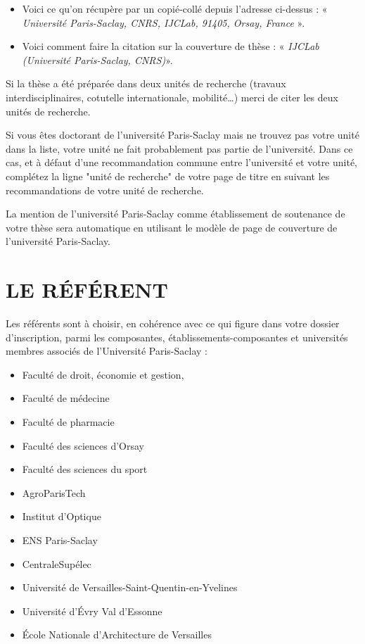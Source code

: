 \documentclass[french,12pt,a4paper]{book}
\begin{document}
\begin{itemize}
\renewcommand{\labelitemi}{$\bullet$}
\item Voici ce qu’on récupère par un copié-collé depuis l’adresse ci-dessus : « \textit{Université Paris-Saclay, CNRS, IJCLab, 91405, Orsay, France} ».
\item Voici comment faire la citation sur la couverture de thèse : « \textit{IJCLab (Université Paris-Saclay, CNRS)}».
\end{itemize}

Si la thèse a été préparée dans deux unités de recherche (travaux interdisciplinaires, cotutelle internationale, mobilité…) merci de citer les deux unités de recherche.\\ \par
Si vous êtes doctorant de l'université Paris-Saclay mais ne trouvez pas votre unité dans la liste, votre unité ne fait probablement pas partie de l'université. Dans ce cas, et à défaut d'une recommandation commune entre l'université et votre unité, complétez la ligne "unité de recherche" de votre page de titre en suivant les recommandations de votre unité de recherche.\\ \par
La mention de l'université Paris-Saclay comme établissement de soutenance de votre thèse sera automatique en utilisant le modèle de page de couverture de l'université Paris-Saclay.

\section{LE RÉFÉRENT}
Les référents sont à choisir, en cohérence avec ce qui figure dans votre dossier d’inscription, parmi les composantes, établissements-composantes et universités membres associés de l’Université Paris-Saclay :

\begin{itemize}
\item Faculté de droit, économie et gestion, 
\item Faculté de médecine
\item Faculté de pharmacie
\item Faculté des sciences d’Orsay
\item Faculté des sciences du sport 
\item AgroParisTech
\item Institut d’Optique
\item ENS Paris-Saclay
\item CentraleSupélec
\item Université de Versailles-Saint-Quentin-en-Yvelines
\item Université d'Évry Val d’Essonne
\item École Nationale d’Architecture de Versailles 
\end{itemize}
\end{document}
